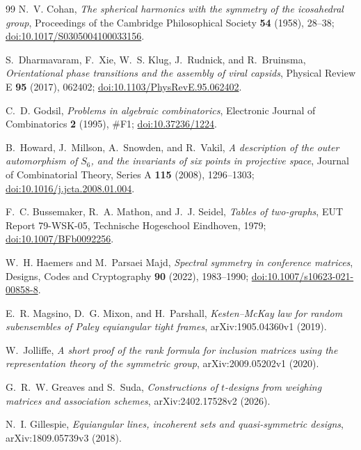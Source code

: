 \begin{thebibliography}{99}
N.~V. Cohan,
\emph{The spherical harmonics with the symmetry of the icosahedral group},
Proceedings of the Cambridge Philosophical Society \textbf{54} (1958),
28--38;
\href{https://doi.org/10.1017/S0305004100033156}
{doi:10.1017/S0305004100033156}.

S.~Dharmavaram, F.~Xie, W.~S. Klug, J.~Rudnick, and R.~Bruinsma,
\emph{Orientational phase transitions and the assembly of viral capsids},
Physical Review E \textbf{95} (2017), 062402;
\href{https://doi.org/10.1103/PhysRevE.95.062402}
{doi:10.1103/PhysRevE.95.062402}.

C.~D. Godsil,
\emph{Problems in algebraic combinatorics},
Electronic Journal of Combinatorics \textbf{2} (1995), \#F1;
\href{https://doi.org/10.37236/1224}{doi:10.37236/1224}.

B.~Howard, J.~Millson, A.~Snowden, and R.~Vakil,
\emph{A description of the outer automorphism of \(S_6\), and the
invariants of six points in projective space},
Journal of Combinatorial Theory, Series A \textbf{115} (2008), 1296--1303;
\href{https://doi.org/10.1016/j.jcta.2008.01.004}
{doi:10.1016/j.jcta.2008.01.004}.

F.~C. Bussemaker, R.~A. Mathon, and J.~J. Seidel,
\emph{Tables of two-graphs},
EUT Report 79-WSK-05, Technische Hogeschool Eindhoven, 1979;
\href{https://doi.org/10.1007/BFb0092256}
{doi:10.1007/BFb0092256}.

W.~H. Haemers and M.~Parsaei Majd,
\emph{Spectral symmetry in conference matrices},
Designs, Codes and Cryptography \textbf{90} (2022), 1983--1990;
\href{https://doi.org/10.1007/s10623-021-00858-8}
{doi:10.1007/s10623-021-00858-8}.

E.~R. Magsino, D.~G. Mixon, and H.~Parshall,
\emph{Kesten--McKay law for random subensembles of Paley equiangular tight
frames},
arXiv:1905.04360v1 (2019).

W.~Jolliffe,
\emph{A short proof of the rank formula for inclusion matrices using the
representation theory of the symmetric group},
arXiv:2009.05202v1 (2020).

G.~R.~W. Greaves and S.~Suda,
\emph{Constructions of \(t\)-designs from weighing matrices and association
schemes},
arXiv:2402.17528v2 (2026).

N.~I. Gillespie,
\emph{Equiangular lines, incoherent sets and quasi-symmetric designs},
arXiv:1809.05739v3 (2018).


\end{thebibliography}
